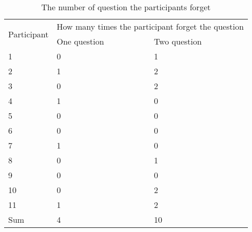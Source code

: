 \begin{table}[!h]
\centering
\begin{tabular}{|l|l|l|}
\hline
\multirow{2}{*}{Participant} & \multicolumn{2}{l|}{How many times the participant forget the question} \\ \cline{2-3}
                             & One question                  & Two question                 \\ \hline
1                            & 0                             & 1                            \\ \hline
2                            & 1                             & 2                            \\ \hline
3                            & 0                             & 2                            \\ \hline
4                            & 1                             & 0                            \\ \hline
5                            & 0                             & 0                            \\ \hline
6                            & 0                             & 0                            \\ \hline
7                            & 1                             & 0                            \\ \hline
8                            & 0                             & 1                            \\ \hline
9                            & 0                             & 0                            \\ \hline
10                           & 0                             & 2                            \\ \hline
11                           & 1                             & 2                            \\ \hline
Sum                          & 4                             & 10                           \\ \hline
\end{tabular}
\caption{The number of question the participants forget}
\label{fig:oneTwoQuestionForget}
\end{table}

%

